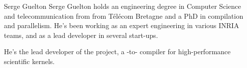 \begin{participant}[type=R,PM=12,gender=male]{Serge Guelton}
    Serge Guelton holds an engineering degree in Computer Science and
    telecommunication from from Télécom Bretagne and a PhD in compilation and
    parallelism. He's been working as an expert engineering in various INRIA
    teams, and as a lead developer in several start-ups.

    He's the lead developer of the \Pythran project, a \Python-to- compiler
    for high-performance scientific kernels.

\end{participant}

